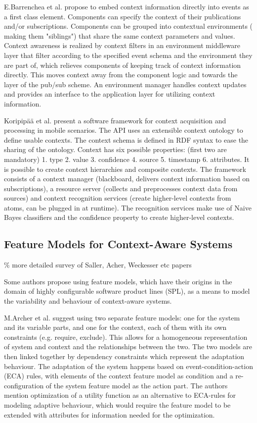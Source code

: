 E.Barrenchea et al. propose to embed context information directly into events as a first class element. Components can specify the context of their publications and/or subscriptions. Components can be grouped into contextual environments ( making them "siblings") that share the same context parameters and values. Context awareness is realized by context filters in an environment middleware layer that filter according to the specified event schema and the environment they are part of, which relieves components of keeping track of context information directly. This moves context away from the component logic and towards the layer of the pub/sub scheme.  An environment manager handles context updates and provides an interface to the application layer for utilizing  context information.

Koripip\"a\"a et al. present a software framework for context acquisition and processing in mobile scenarios. The API uses an extensible context ontology to define usable contexts. The context schema is defined in RDF syntax to ease the sharing of the ontology. Context has six possible properties: (first two are mandatory) 1. type 2. value 3. confidence 4. source 5. timestamp 6. attributes. It is possible to create context hierarchies and composite contexts.
The framework consists of a context manager (blackboard, delivers context information based on subscriptions), a resource server (collects and preprocesses context data from sources) and context recognition services (create higher-level contexts from atoms, can be plugged in at runtime). The recognition services make use of Naive Bayes classifiers and the confidence property to create higher-level contexts.

\subsection{Feature Models for Context-Aware Systems}
\% more detailed survey of Saller, Acher, Weckesser etc papers 

Some authors propose using feature models, which have their origins in the domain of highly configurable software product lines (SPL), as a means to model the variability and behaviour of context-aware systems.

M.Archer et al. suggest using two separate feature models: one for the system and its variable parts, and one for the context, each of them with its own constraints (e.g. require, exclude). This allows for a homogeneous representation of system and context and the relationships between the two. The two models are then linked together by dependency constraints which represent the adaptation behaviour. The adaptation of the system happens based on event-condition-action (ECA) rules, with elements of the context feature model as condition and a re-configuration of the system feature model as the action part. The authors mention optimization of a utility function as an alternative to ECA-rules for modeling adaptive behaviour, which would require the feature model to be extended with attributes for information needed for the optimization.

